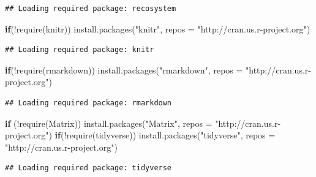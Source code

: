 \documentclass[
]{article}
\newenvironment{Shaded}{}{}
\newcommand{\AttributeTok}[1]{\textcolor[rgb]{0.49,0.56,0.16}{#1}}
\newcommand{\ControlFlowTok}[1]{\textcolor[rgb]{0.00,0.44,0.13}{\textbf{#1}}}
\newcommand{\FunctionTok}[1]{\textcolor[rgb]{0.02,0.16,0.49}{#1}}
\newcommand{\NormalTok}[1]{#1}
\newcommand{\SpecialCharTok}[1]{\textcolor[rgb]{0.25,0.44,0.63}{#1}}
\newcommand{\StringTok}[1]{\textcolor[rgb]{0.25,0.44,0.63}{#1}}
\begin{document}
\begin{verbatim}
## Loading required package: recosystem
\end{verbatim}

\begin{Shaded}
\begin{Highlighting}[]
\ControlFlowTok{if}\NormalTok{(}\SpecialCharTok{!}\FunctionTok{require}\NormalTok{(knitr)) }\FunctionTok{install.packages}\NormalTok{(}\StringTok{"knitr"}\NormalTok{, }
                                     \AttributeTok{repos =} \StringTok{"http://cran.us.r{-}project.org"}\NormalTok{)}
\end{Highlighting}
\end{Shaded}

\begin{verbatim}
## Loading required package: knitr
\end{verbatim}

\begin{Shaded}
\begin{Highlighting}[]
\ControlFlowTok{if}\NormalTok{(}\SpecialCharTok{!}\FunctionTok{require}\NormalTok{(rmarkdown)) }\FunctionTok{install.packages}\NormalTok{(}\StringTok{"rmarkdown"}\NormalTok{, }
                                         \AttributeTok{repos =} \StringTok{"http://cran.us.r{-}project.org"}\NormalTok{)}
\end{Highlighting}
\end{Shaded}

\begin{verbatim}
## Loading required package: rmarkdown
\end{verbatim}

\begin{Shaded}
\begin{Highlighting}[]
\ControlFlowTok{if}\NormalTok{ (}\SpecialCharTok{!}\FunctionTok{require}\NormalTok{(Matrix)) }\FunctionTok{install.packages}\NormalTok{(}\StringTok{"Matrix"}\NormalTok{, }
                                       \AttributeTok{repos =} \StringTok{"http://cran.us.r{-}project.org"}\NormalTok{)}
\ControlFlowTok{if}\NormalTok{(}\SpecialCharTok{!}\FunctionTok{require}\NormalTok{(tidyverse)) }\FunctionTok{install.packages}\NormalTok{(}\StringTok{"tidyverse"}\NormalTok{, }
                                         \AttributeTok{repos =} \StringTok{"http://cran.us.r{-}project.org"}\NormalTok{)}
\end{Highlighting}
\end{Shaded}

\begin{verbatim}
## Loading required package: tidyverse
\end{verbatim}
\end{document}

